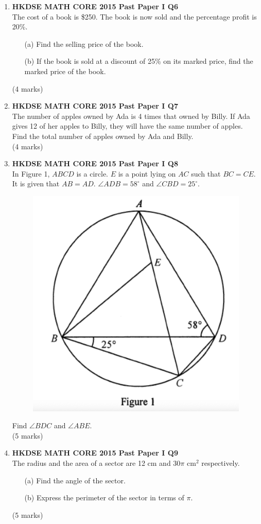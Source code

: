 \documentclass[12pt]{article}
\begin{document}
\begin{enumerate}
	\item \textbf{HKDSE MATH CORE 2015 Past Paper I Q6}\\
	The cost of a book is \$250. The book is now sold and the percentage profit is 20\%.
	\begin{enumerate}
		\item[(a)] Find the selling price of the book.
		\item[(b)] If the book is sold at a discount of 25\% on its marked price, find the marked price of the book.
	\end{enumerate}
	(4 marks)

	\item \textbf{HKDSE MATH CORE 2015 Past Paper I Q7}\\
	The number of apples owned by Ada is 4 times that owned by Billy. If Ada gives 12 of her apples to Billy, they will have the same number of apples. Find the total number of apples owned by Ada and Billy. \\(4 marks)
	
	\item \textbf{HKDSE MATH CORE 2015 Past Paper I Q8}\\
	In Figure 1, $ABCD$ is a circle. $E$ is a point lying on $AC$ such that $BC = CE$. It is given that $AB = AD$. $\angle ADB = 58^\circ$ and $\angle CBD = 25^\circ$.
	\begin{figure}[H]
		\centering
		\includegraphics[width = .3\linewidth]{2015Figure1.1}
	\end{figure}
	Find $\angle BDC$ and $\angle ABE$. \\(5 marks)
	
	\item \textbf{HKDSE MATH CORE 2015 Past Paper I Q9}\\
	The radius and the area of a sector are 12 cm and $30\pi$ cm$^2$ respectively.
	\begin{enumerate}
		\item[(a)] Find the angle of the sector.
		\item[(b)] Express the perimeter of the sector in terms of $\pi$.
	\end{enumerate}
	(5 marks)


\end{enumerate}
\end{document}
